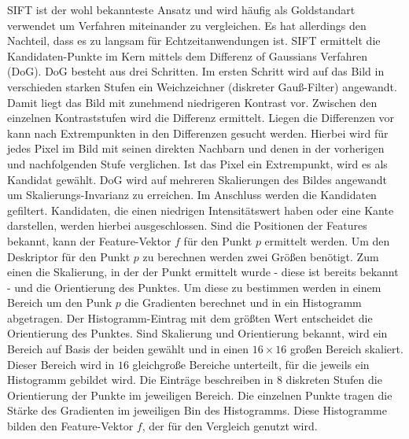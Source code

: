 \documentclass[12pt,titlepage, twoside]{article}
\begin{document}
SIFT ist der wohl bekannteste Ansatz und wird häufig als Goldstandart verwendet um Verfahren miteinander zu vergleichen. Es hat allerdings den Nachteil, dass es zu langsam für Echtzeitanwendungen ist.
SIFT ermittelt die Kandidaten-Punkte im Kern mittels dem Differenz of Gaussians Verfahren (DoG). DoG besteht aus drei Schritten. Im ersten Schritt wird auf das Bild in verschieden starken Stufen ein Weichzeichner (diskreter Gauß-Filter) angewandt.
Damit liegt das Bild mit zunehmend niedrigeren Kontrast vor. Zwischen den einzelnen Kontraststufen wird die Differenz ermittelt. Liegen die Differenzen vor kann nach Extrempunkten in den Differenzen gesucht werden.
Hierbei wird für jedes Pixel im Bild mit seinen direkten Nachbarn und denen in der vorherigen und nachfolgenden Stufe verglichen. Ist das Pixel ein Extrempunkt, wird es als Kandidat gewählt.
DoG wird auf mehreren Skalierungen des Bildes angewandt um Skalierungs-Invarianz zu erreichen.
Im Anschluss werden die Kandidaten gefiltert. Kandidaten, die einen niedrigen Intensitätswert haben oder eine Kante darstellen, werden hierbei ausgeschlossen.
Sind die Positionen der Features bekannt, kann der Feature-Vektor $f$ für den Punkt $p$ ermittelt werden. 
Um den Deskriptor für den Punkt $p$ zu berechnen werden zwei Größen benötigt. Zum einen die Skalierung, in der der Punkt ermittelt wurde - diese ist bereits bekannt - und die Orientierung des Punktes.
Um diese zu bestimmen werden in einem Bereich um den Punk $p$ die Gradienten berechnet und in ein Histogramm abgetragen. Der Histogramm-Eintrag mit dem größten Wert entscheidet die Orientierung des Punktes.
Sind Skalierung und Orientierung bekannt, wird ein Bereich auf Basis der beiden gewählt und in einen $16\times 16$ großen Bereich skaliert. 
Dieser Bereich wird in $16$ gleichgroße Bereiche unterteilt, für die jeweils ein Histogramm gebildet wird. 
Die Einträge beschreiben in $8$ diskreten Stufen die Orientierung der Punkte im jeweiligen Bereich. Die einzelnen Punkte tragen die Stärke des Gradienten im jeweiligen Bin des Histogramms.
Diese Histogramme bilden den Feature-Vektor $f$, der für den Vergleich genutzt wird.
\end{document}
